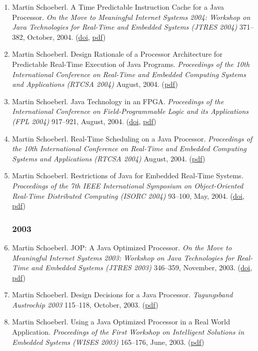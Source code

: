 \begin{enumerate}
\item Martin Schoeberl.
 A Time Predictable Instruction Cache for a Java Processor.
 \emph{On the Move to Meaningful Internet Systems 2004: Workshop on {J}ava Technologies for Real-Time and Embedded Systems (JTRES 2004)} 371--382, October, 2004.
(\href{http://dx.doi.org/10.1007/b102133}{doi}, \href{http://www.jopdesign.com/doc/jtres_cache.pdf}{pdf})

\item Martin Schoeberl.
 Design Rationale of a Processor Architecture for Predictable Real-Time Execution of Java Programs.
 \emph{Proceedings of the 10th International Conference on Real-Time and Embedded Computing Systems and Applications (RTCSA 2004)} August, 2004.
(\href{http://www.jopdesign.com/doc/design.pdf}{pdf})

\item Martin Schoeberl.
 Java Technology in an FPGA.
 \emph{Proceedings of the International Conference on Field-Programmable Logic and its Applications (FPL 2004)} 917--921, August, 2004.
(\href{http://dx.doi.org/10.1007/b99787}{doi}, \href{http://www.jopdesign.com/doc/fpl2004.pdf}{pdf})

\item Martin Schoeberl.
 Real-Time Scheduling on a Java Processor.
 \emph{Proceedings of the 10th International Conference on Real-Time and Embedded Computing Systems and Applications (RTCSA 2004)} August, 2004.
(\href{http://www.jopdesign.com/doc/javasched.pdf}{pdf})

\item Martin Schoeberl.
 Restrictions of Java for Embedded Real-Time Systems.
 \emph{Proceedings of the 7th IEEE International Symposium on Object-Oriented Real-Time Distributed Computing (ISORC 2004)} 93--100, May, 2004.
(\href{http://dx.doi.org/10.1109/ISORC.2004.1300334}{doi}, \href{http://www.jopdesign.com/doc/rtjava.pdf}{pdf})


\subsubsection*{2003}

\item Martin Schoeberl.
 JOP: A Java Optimized Processor.
 \emph{On the Move to Meaningful Internet Systems 2003: Workshop on {J}ava Technologies for Real-Time and Embedded Systems (JTRES 2003)} 346--359, November, 2003.
(\href{http://dx.doi.org/10.1007/b94345}{doi}, \href{http://www.jopdesign.com/doc/jtres03.pdf}{pdf})

\item Martin Schoeberl.
 Design Decisions for a Java Processor.
 \emph{Tagungsband Austrochip 2003} 115--118, October, 2003.
(\href{http://www.jopdesign.com/doc/austrochip03.pdf}{pdf})

\item Martin Schoeberl.
 Using a Java Optimized Processor in a Real World Application.
 \emph{Proceedings of the First Workshop on Intelligent Solutions in Embedded Systems (WISES 2003)} 165--176, June, 2003.
(\href{http://www.jopdesign.com/doc/wises03.pdf}{pdf})


\end{enumerate}

